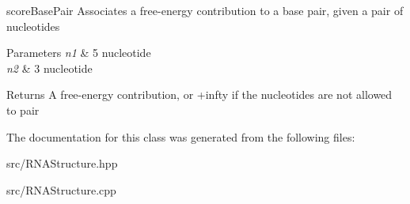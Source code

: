 score\+Base\+Pair Associates a free-\/energy contribution to a base pair, given a pair of nucleotides 


\begin{DoxyParams}{Parameters}
{\em n1} & 5\textquotesingle{} nucleotide \\
\hline
{\em n2} & 3\textquotesingle{} nucleotide \\
\hline
\end{DoxyParams}
\begin{DoxyReturn}{Returns}
A free-\/energy contribution, or +infty if the nucleotides are not allowed to pair 
\end{DoxyReturn}


The documentation for this class was generated from the following files\+:\begin{DoxyCompactItemize}
\item 
src/R\+N\+A\+Structure.\+hpp\item 
src/R\+N\+A\+Structure.\+cpp\end{DoxyCompactItemize}
